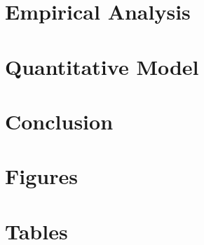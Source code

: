 \documentclass[template-combined]{subfiles}
\begin{document}
\section{Empirical Analysis} \label{sec:empirics}


\section{Quantitative Model} \label{sec:model}
% 

\section{Conclusion} \label{sec:conclusion}
% 






\clearpage
\begin{singlespacing}
	
\end{singlespacing}




\clearpage
\section*{Figures}


\clearpage
\section*{Tables}



\unhidefromtoc
\end{document}
